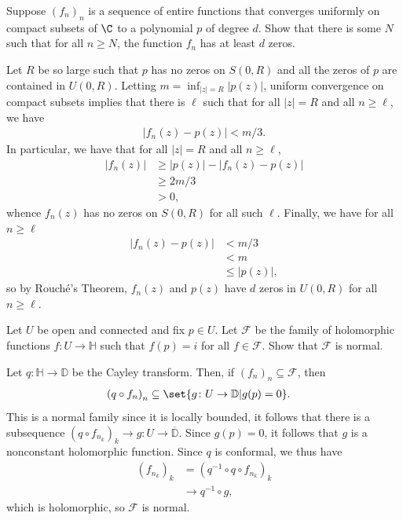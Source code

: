 \documentclass[10pt]{mypackage}
\renewcommand{\D}{\mathbb{D}}
\begin{document}
\begin{problem}[Problem 4]
  Suppose $\left( f_n \right)_n$ is a sequence of entire functions that converges uniformly on compact subsets of $\C$ to a polynomial $p$ of degree $d$. Show that there is some $N$ such that for all $n\geq N$, the function $f_n$ has at least $d$ zeros.
\end{problem}
\begin{solution}
  Let $R$ be so large such that $p$ has no zeros on $S(0,R)$ and all the zeros of $p$ are contained in $U(0,R)$. Letting $m = \inf_{|z| = R} \left\vert p(z) \right\vert$, uniform convergence on compact subsets implies that there is $\ell$ such that for all $|z| = R$ and all $n\geq \ell$, we have 
  \begin{align*}
    \left\vert f_n(z) - p(z) \right\vert < m/3.
  \end{align*}
  In particular, we have that for all $|z| = R$ and all $n\geq \ell$,
  \begin{align*}
    \left\vert f_n(z)  \right\vert &\geq \left\vert p(z) \right\vert - \left\vert f_n(z) - p(z) \right\vert\\
                                   &\geq 2m/3\\
                                   &> 0,
  \end{align*}
  whence $f_n(z)$ has no zeros on $S(0,R)$ for all such $\ell$. Finally, we have for all $n\geq \ell$
  \begin{align*}
    \left\vert f_n(z) - p(z) \right\vert &< m/3\\
                                         &< m\\
                                         &\leq \left\vert p(z) \right\vert,
  \end{align*}
  so by Rouché's Theorem, $f_n(z)$ and $p(z)$ have $d$ zeros in $U(0,R)$ for all $n\geq \ell$.
\end{solution}
\begin{problem}[Problem 5]
  Let $U$ be open and connected and fix $p\in U$. Let $\mathcal{F}$ be the family of holomorphic functions $f\colon U\rightarrow \mathbb{H}$ such that $f(p) = i$ for all $f\in \mathcal{F}$. Show that $\mathcal{F}$ is normal.
\end{problem}
\begin{solution}
  Let $q\colon \mathbb{H}\rightarrow \D$ be the Cayley transform. Then, if $\left( f_n \right)_n\subseteq \mathcal{F}$, then 
  \begin{align*}
    \left( q\circ f_n \right)_{n} &\subseteq \set{g\colon U\rightarrow \D | g(p) = 0}.
  \end{align*}
  This is a normal family since it is locally bounded, it follows that there is a subsequence $\left( q\circ f_{n_k} \right)_k\rightarrow g\colon U\rightarrow \overline{\D}$. Since $g(p) = 0$, it follows that $g$ is a nonconstant holomorphic function. Since $q$ is conformal, we thus have
  \begin{align*}
    \left( f_{n_k} \right)_k &= \left( q^{-1}\circ q \circ f_{n_k} \right)_k\\
                             &\rightarrow q^{-1}\circ g,
  \end{align*}
  which is holomorphic, so $ \mathcal{F} $ is normal.
\end{solution}
\end{document}
